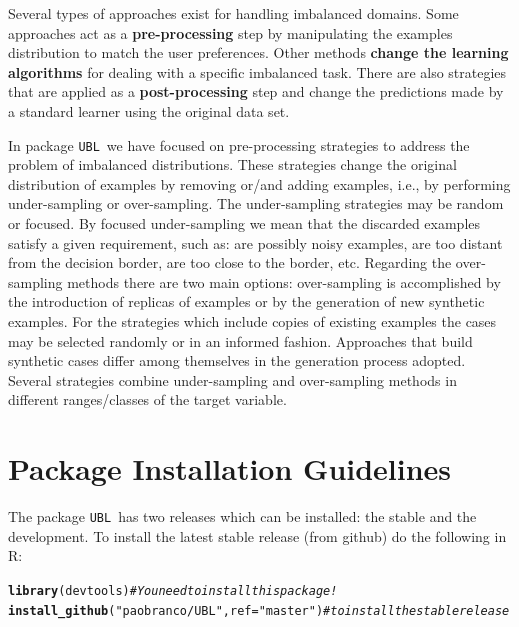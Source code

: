 \documentclass[10pt,a4paper]{article}\usepackage[]{graphicx}\usepackage[]{color}
\makeatletter
\newcommand{\hlstr}[1]{\textcolor[rgb]{0.192,0.494,0.8}{#1}}%
\newcommand{\hlcom}[1]{\textcolor[rgb]{0.678,0.584,0.686}{\textit{#1}}}%
\newcommand{\hlstd}[1]{\textcolor[rgb]{0.345,0.345,0.345}{#1}}%
\newcommand{\hlkwc}[1]{\textcolor[rgb]{0.333,0.667,0.333}{#1}}%
\newcommand{\hlkwd}[1]{\textcolor[rgb]{0.737,0.353,0.396}{\textbf{#1}}}%
\newenvironment{kframe}{%
 \def\at@end@of@kframe{}%
 \ifinner\ifhmode%
  \def\at@end@of@kframe{\end{minipage}}%
  \begin{minipage}{\columnwidth}%
 \fi\fi%
 \def\FrameCommand##1{\hskip\@totalleftmargin \hskip-\fboxsep
 \colorbox{shadecolor}{##1}\hskip-\fboxsep
     \hskip-\linewidth \hskip-\@totalleftmargin \hskip\columnwidth}%
 \MakeFramed {\advance\hsize-\width
   \@totalleftmargin\z@ \linewidth\hsize
   \@setminipage}}%
 {\par\unskip\endMakeFramed%
 \at@end@of@kframe}
\newenvironment{knitrout}{}{} %
\newcommand{\UBL}{package \texttt{UBL}\ }
\makeatother
\begin{document}
Several types of approaches exist for handling imbalanced domains. Some approaches act as a \textbf{pre-processing} step by manipulating the examples distribution to match the user preferences. Other methods \textbf{change the learning algorithms} for dealing with a specific imbalanced task. There are also strategies that are applied as a \textbf{post-processing} step and change the predictions made by a standard learner using the original data set.


In \UBL we have focused on pre-processing strategies to address the problem of imbalanced distributions. These strategies change the original distribution of examples by removing or/and adding examples, i.e., by performing under-sampling or over-sampling. The under-sampling strategies may be random or focused. By focused under-sampling we mean that the discarded examples satisfy a given requirement, such as: are possibly noisy examples, are too distant from the decision border, are too close to the border, etc. Regarding the over-sampling methods there are two main options: over-sampling is accomplished by the introduction of replicas of examples or by the generation of new synthetic examples. For the strategies which include copies of existing examples the cases may be selected randomly or in an informed fashion. Approaches that build synthetic cases differ among themselves in the generation process adopted. Several strategies combine under-sampling and over-sampling methods in different ranges/classes of the target variable.



\section{Package Installation Guidelines}

The \UBL has two releases which can be installed: the stable and the development. To install the latest stable release (from github) do the following in R:

\begin{knitrout}\footnotesize
{}\color{fgcolor}\begin{kframe}
\begin{alltt}
\hlkwd{library}\hlstd{(devtools)}  \hlcom{# You need to install this package!}
\hlkwd{install_github}\hlstd{(}\hlstr{"paobranco/UBL"}\hlstd{,}\hlkwc{ref}\hlstd{=}\hlstr{"master"}\hlstd{)} \hlcom{# to install the stable release}
\end{alltt}
\end{kframe}
\end{knitrout}
\end{document}
